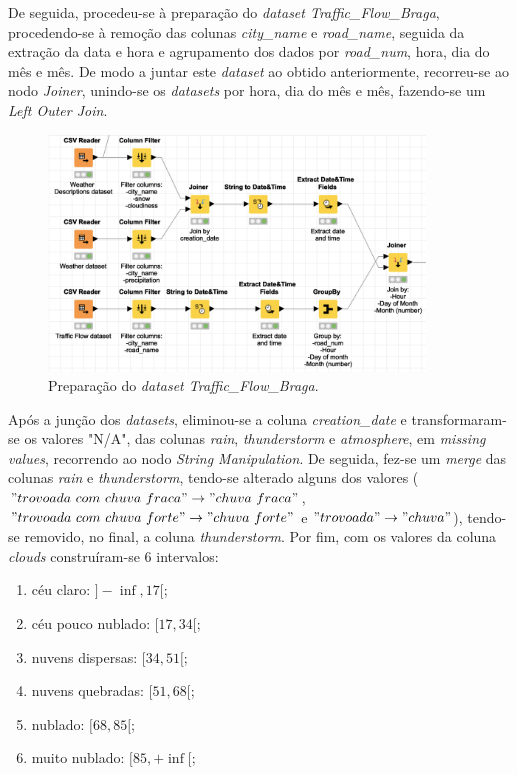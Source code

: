 \documentclass[a4paper, 12pt]{article}
\begin{document}
De seguida, procedeu-se à preparação do \textit{dataset Traffic\_Flow\_Braga}, procedendo-se à remoção das colunas \textit{city\_name} e \textit{road\_name}, seguida da extração da data e hora e agrupamento dos dados por \textit{road\_num}, hora, dia do mês e mês. De modo a juntar este \textit{dataset} ao obtido anteriormente, recorreu-se ao nodo \textit{Joiner}, unindo-se os \textit{datasets} por hora, dia do mês e mês, fazendo-se um \textit{Left Outer Join}.

\begin{figure}[H]
	\centering
	\includegraphics[width=10cm]{join}
	\caption{Preparação do \textit{dataset Traffic\_Flow\_Braga}.}
\end{figure}

Após a junção dos \textit{datasets}, eliminou-se a coluna \textit{creation\_date} e transformaram-se os valores "N/A", das colunas \textit{rain}, \textit{thunderstorm} e \textit{atmosphere}, em \textit{missing values}, recorrendo ao nodo \textit{String Manipulation}. De seguida, fez-se um \textit{merge} das colunas \textit{rain} e \textit{thunderstorm}, tendo-se alterado alguns dos valores ($"trovoada \ com \ chuva \ fraca" \rightarrow "chuva \ fraca"$, $"trovoada \ com \ chuva \ forte" \rightarrow "chuva \ forte"$ e $"trovoada" \rightarrow "chuva"$), tendo-se removido, no final, a coluna \textit{thunderstorm}. Por fim, com os valores da coluna \textit{clouds} construíram-se 6 intervalos:

\begin{enumerate}
	\item céu claro: $]-\inf,17[$;
	\item céu pouco nublado: $[17,34[$;
	\item nuvens dispersas: $[34,51[$;
	\item nuvens quebradas: $[51,68[$;
	\item nublado: $[68,85[$;
	\item muito nublado: $[85,+\inf[$;
\end{enumerate}
\end{document}
